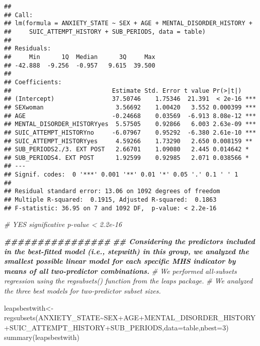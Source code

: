 \documentclass[
]{book}
\newenvironment{Shaded}{\begin{snugshade}}{\end{snugshade}}
\newcommand{\AttributeTok}[1]{\textcolor[rgb]{0.77,0.63,0.00}{#1}}
\newcommand{\CommentTok}[1]{\textcolor[rgb]{0.56,0.35,0.01}{\textit{#1}}}
\newcommand{\DecValTok}[1]{\textcolor[rgb]{0.00,0.00,0.81}{#1}}
\newcommand{\DocumentationTok}[1]{\textcolor[rgb]{0.56,0.35,0.01}{\textbf{\textit{#1}}}}
\newcommand{\FunctionTok}[1]{\textcolor[rgb]{0.00,0.00,0.00}{#1}}
\newcommand{\NormalTok}[1]{#1}
\newcommand{\OtherTok}[1]{\textcolor[rgb]{0.56,0.35,0.01}{#1}}
\newcommand{\SpecialCharTok}[1]{\textcolor[rgb]{0.00,0.00,0.00}{#1}}
\begin{document}
\begin{verbatim}
## 
## Call:
## lm(formula = ANXIETY_STATE ~ SEX + AGE + MENTAL_DISORDER_HISTORY + 
##     SUIC_ATTEMPT_HISTORY + SUB_PERIODS, data = table)
## 
## Residuals:
##     Min      1Q  Median      3Q     Max 
## -42.888  -9.256  -0.957   9.615  39.500 
## 
## Coefficients:
##                            Estimate Std. Error t value Pr(>|t|)    
## (Intercept)                37.50746    1.75346  21.391  < 2e-16 ***
## SEXwoman                    3.56692    1.00420   3.552 0.000399 ***
## AGE                        -0.24668    0.03569  -6.913 8.08e-12 ***
## MENTAL_DISORDER_HISTORYyes  5.57505    0.92866   6.003 2.63e-09 ***
## SUIC_ATTEMPT_HISTORYno     -6.07967    0.95292  -6.380 2.61e-10 ***
## SUIC_ATTEMPT_HISTORYyes     4.59266    1.73290   2.650 0.008159 ** 
## SUB_PERIODS2./3. EXT POST   2.66701    1.09080   2.445 0.014642 *  
## SUB_PERIODS4. EXT POST      1.92599    0.92985   2.071 0.038566 *  
## ---
## Signif. codes:  0 '***' 0.001 '**' 0.01 '*' 0.05 '.' 0.1 ' ' 1
## 
## Residual standard error: 13.06 on 1092 degrees of freedom
## Multiple R-squared:  0.1915, Adjusted R-squared:  0.1863 
## F-statistic: 36.95 on 7 and 1092 DF,  p-value: < 2.2e-16
\end{verbatim}

\begin{Shaded}
\begin{Highlighting}[]
\CommentTok{\# YES significative p{-}value \textless{} 2.2e{-}16}



\DocumentationTok{\#\#\#\#\#\#\#\#\#\#\#\#\#\#\#\#}
\DocumentationTok{\#\# Considering the predictors included in the best{-}fitted model (i.e., stepwith) in this group, we analyzed the smallest possible linear model for each specific MHS indicator by means of all two{-}predictor combinations.  }
\CommentTok{\# We performed all{-}subsets regression using the regsubsets() function from the leaps package.}
\CommentTok{\# We analyzed the three best models for two{-}predictor subset sizes.}

\NormalTok{leapsbestwith}\OtherTok{\textless{}{-}}\FunctionTok{regsubsets}\NormalTok{(ANXIETY\_STATE}\SpecialCharTok{\textasciitilde{}}\NormalTok{SEX}\SpecialCharTok{+}\NormalTok{AGE}\SpecialCharTok{+}\NormalTok{MENTAL\_DISORDER\_HISTORY}\SpecialCharTok{+}\NormalTok{SUIC\_ATTEMPT\_HISTORY}\SpecialCharTok{+}\NormalTok{SUB\_PERIODS,}\AttributeTok{data=}\NormalTok{table,}\AttributeTok{nbest=}\DecValTok{3}\NormalTok{)}
\FunctionTok{summary}\NormalTok{(leapsbestwith)}
\end{Highlighting}
\end{Shaded}
\end{document}
